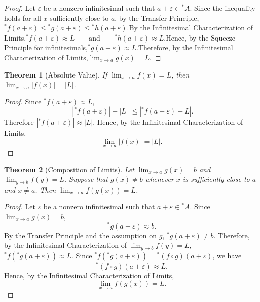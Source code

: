 \documentclass[10pt,a4paper]{book}
\newtheorem{theorem}{Theorem}[section]
\begin{document}
\begin{proof}

    Let $\varepsilon$ be a nonzero infinitesimal such that $a+\varepsilon\in{}^*A$.
    Since the inequality holds for all $x$ sufficiently close to $a$, by the
    Transfer Principle,$ {}^*f(a+\varepsilon) \leq {}^*g(a+\varepsilon) \leq
        {}^*h(a+\varepsilon). $By the Infinitesimal Characterization of Limits,$
        {}^*f(a+\varepsilon)\approx L \qquad\text{and}\qquad
        {}^*h(a+\varepsilon)\approx L. $Hence, by the Squeeze Principle for
    infinitesimals,$ {}^*g(a+\varepsilon)\approx L.$Therefore, by the Infinitesimal
    Characterization of Limits,$ \lim_{x\to a}g(x)=L.$

\end{proof}
\begin{theorem}[Absolute Value]

    If $\lim_{x\to a}f(x)=L$, then $\lim_{x\to a}|f(x)|=|L|$.

\end{theorem}

\begin{proof}

    Since ${}^*f(a+\varepsilon)\approx L$, $$
        \left||{}^*f(a+\varepsilon)|-|L|\right| \leq |{}^*f(a+\varepsilon)-L|. $$
    Therefore $|{}^*f(a+\varepsilon)|\approx|L|$. Hence, by the Infinitesimal
    Characterization of Limits, $$ \lim_{x\to a}|f(x)|=|L|. $$

\end{proof}

\begin{theorem}[Composition of Limits]

    Let $\lim_{x\to a}g(x)=b$ and $\lim_{y\to b}f(y)=L$. Suppose that $g(x)\neq b$
    whenever $x$ is sufficiently close to $a$ and $x\neq a$. Then $\lim_{x\to
            a}f(g(x))=L$.

\end{theorem}

\begin{proof}

    Let $\varepsilon$ be a nonzero infinitesimal such that $a+\varepsilon\in{}^*A$.
    Since $\lim_{x\to a}g(x)=b$, $$ {}^*g(a+\varepsilon)\approx b. $$ By the
    Transfer Principle and the assumption on $g$, ${}^*g(a+\varepsilon)\neq b$.
    Therefore, by the Infinitesimal Characterization of $\lim_{y\to b}f(y)=L$,
    ${}^*f({}^*g(a+\varepsilon))\approx L$. Since
    ${}^*f({}^*g(a+\varepsilon))={}^*(f\circ g)(a+\varepsilon)$, we have $$
        {}^*(f\circ g)(a+\varepsilon)\approx L. $$ Hence, by the Infinitesimal
    Characterization of Limits, $$ \lim_{x\to a}f(g(x))=L. $$

\end{proof}
\end{document}
